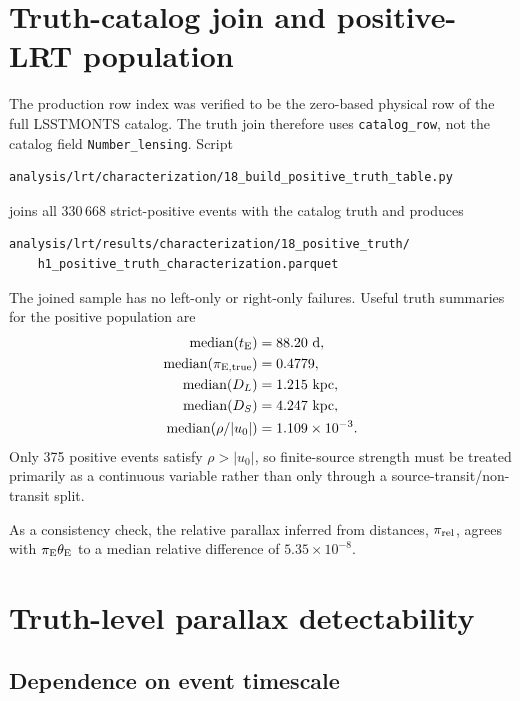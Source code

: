 \documentclass[11pt,a4paper]{article}
\newcommand{\te}{t_{\rm E}}
\begin{document}
\section{Truth-catalog join and positive-LRT population}

The production row index was verified to be the zero-based physical row of the
full LSSTMONTS catalog.  The truth join therefore uses \texttt{catalog\_row},
not the catalog field \texttt{Number\_lensing}.  Script
\begin{verbatim}
analysis/lrt/characterization/18_build_positive_truth_table.py
\end{verbatim}
joins all $330\,668$ strict-positive events with the catalog truth and produces
\begin{verbatim}
analysis/lrt/results/characterization/18_positive_truth/
    h1_positive_truth_characterization.parquet
\end{verbatim}

The joined sample has no left-only or right-only failures.  Useful truth
summaries for the positive population are
\begin{align}
    \mathrm{median}(\te) &= 88.20~\mathrm{d},\\
    \mathrm{median}(\pi_{\rm E,true}) &= 0.4779,\\
    \mathrm{median}(D_L) &= 1.215~\mathrm{kpc},\\
    \mathrm{median}(D_S) &= 4.247~\mathrm{kpc},\\
    \mathrm{median}\!\left(\rho/|u_0|\right) &= 1.109\times10^{-3}.
\end{align}
Only 375 positive events satisfy $\rho>|u_0|$, so finite-source strength must
be treated primarily as a continuous variable rather than only through a
source-transit/non-transit split.

As a consistency check, the relative parallax inferred from distances,
$\pi_{\rm rel}$, agrees with $\pi_{\rm E}\theta_{\rm E}$ to a median relative
difference of $5.35\times10^{-8}$.

\section{Truth-level parallax detectability}

\subsection{Dependence on event timescale}
\end{document}
